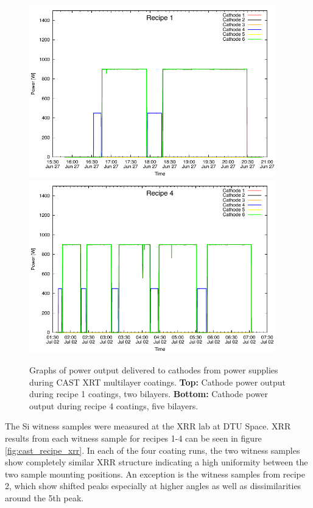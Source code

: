\begin{figure}[htbp]
  \centering  \includegraphics[height=7.5cm]{figures/cast/power_recipe1.pdf}  \includegraphics[height=7.5cm]{figures/cast/power_recipe4.pdf}\\
  \caption{\footnotesize Graphs of power output delivered to cathodes from power supplies during CAST XRT multilayer coatings. \textbf{Top:} Cathode power output during recipe 1 coatings, two bilayers. \textbf{Bottom:} Cathode power output during recipe 4 coatings, five bilayers.}
  \label{fig:cast_coatings_power}
\end{figure}

The Si witness samples were measured at the XRR lab at DTU Space. XRR results from each witness sample for recipes 1-4 can be seen in figure \ref{fig:cast_recipe_xrr}. In each of the four coating runs, the two witness samples show completely similar XRR structure indicating a high uniformity between the two sample mounting positions. An exception is the witness samples from recipe 2, which show shifted peaks especially at higher angles as well as dissimilarities around the 5th peak.

